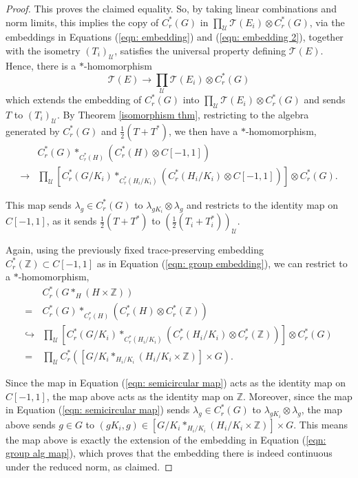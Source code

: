 \documentclass[10pt,a4paper]{amsart}
\newcommand{\Z}{\ensuremath{\mathbb{Z}}}
\newcommand{\cT}{\ensuremath{\mathcal{T}}}
\newcommand{\cU}{\ensuremath{\mathcal{U}}}
\begin{document}
\begin{proof}
    This proves the claimed equality. So, by taking linear combinations and norm limits, this implies the copy of $C_r^\ast(G)$ in $\prod_\cU \cT(E_i) \otimes C_r^\ast(G)$, via the embeddings in Equations (\ref{eqn: embedding}) and (\ref{eqn: embedding 2}), together with the isometry $(T_i)_\cU$, satisfies the universal property defining $\cT(E)$. Hence, there is a $\ast$-homomorphism
    \begin{equation*}
        \cT(E) \to \prod_\cU \cT(E_i) \otimes C_r^*(G)
    \end{equation*}
    which extends the embedding of $C_r^\ast(G)$ into $\prod_\cU \cT(E_i) \otimes C_r^\ast(G)$ and sends $T$ to $(T_i)_\cU$. By Theorem \ref{isomorphism thm}, restricting to the algebra generated by $C_r^\ast(G)$ and $\frac{1}{2}(T + T^\ast)$, we then have a $\ast$-homomorphism,
    \begin{equation}\label{eqn: semicircular map}
    \begin{split}
        &C_r^\ast(G) \ast_{C_r^\ast(H)} (C_r^\ast(H) \otimes C[-1,1])\\
        \to &\prod_\cU [C_r^\ast(G/K_i) \ast_{C_r^\ast(H_i/K_i)} (C_r^\ast(H_i/K_i) \otimes C[-1,1])] \otimes C_r^\ast(G).
    \end{split}
    \end{equation}

    This map sends $\lambda_g \in C_r^\ast(G)$ to $\lambda_{gK_i} \otimes \lambda_g$ and restricts to the identity map on $C[-1, 1]$, as it sends $\frac{1}{2}(T + T^\ast)$ to $\left(\frac{1}{2}(T_i + T_i^\ast)\right)_\cU$.

    Again, using the previously fixed trace-preserving embedding $C_r^\ast(\Z) \subset C[-1, 1]$ as in Equation (\ref{eqn: group embedding}), we can restrict to a $\ast$-homomorphism,
    \begin{equation*}
    \begin{split}
        &C_r^\ast(G \ast_H (H \times \Z))\\
        = &C_r^\ast(G) \ast_{C_r^\ast(H)} (C_r^\ast(H) \otimes C_r^\ast(\Z))\\
        \hookrightarrow &\prod_\cU [C_r^\ast(G/K_i) \ast_{C_r^\ast(H_i/K_i)} (C_r^\ast(H_i/K_i) \otimes C_r^\ast(\Z))] \otimes C_r^\ast(G)\\
        = &\prod_\cU C_r^\ast([G/K_i \ast_{H_i/K_i} (H_i/K_i \times \Z)] \times G).
    \end{split}
    \end{equation*}

    Since the map in Equation (\ref{eqn: semicircular map}) acts as the identity map on $C[-1, 1]$, the map above acts as the identity map on $\Z$. Moreover, since the map in Equation (\ref{eqn: semicircular map}) sends $\lambda_g \in C_r^\ast(G)$ to $\lambda_{gK_i} \otimes \lambda_g$, the map above sends $g \in G$ to $(gK_i, g) \in [G/K_i \ast_{H_i/K_i} (H_i/K_i \times \Z)] \times G$. This means the map above is exactly the extension of the embedding in Equation (\ref{eqn: group alg map}), which proves that the embedding there is indeed continuous under the reduced norm, as claimed.
\end{proof}
\end{document}
